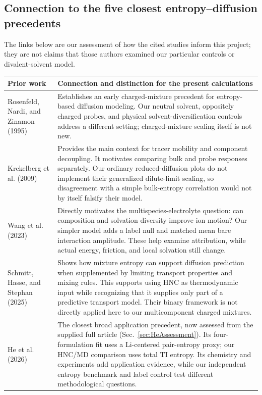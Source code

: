 \documentclass[11pt,a4paper]{article}
\begin{document}
\subsection{Connection to the five closest entropy--diffusion precedents}
The links below are our assessment of how the cited studies inform this
project; they are not claims that those authors examined our particular
controls or divalent-solvent model.
\begin{longtable}{@{}p{}p{}@{}}
\toprule
Prior work & Connection and distinction for the present calculations\\
\midrule
\endhead
Rosenfeld, Nardi, and Zinamon (1995)~\cite{Rosenfeld1995} &
Establishes an early charged-mixture precedent for entropy-based diffusion
modeling. Our neutral solvent, oppositely charged probes, and physical
solvent-diversification controls address a different setting; charged-mixture
scaling itself is not new.\\[3pt]
Krekelberg et al. (2009)~\cite{Krekelberg2009} &
Provides the main context for tracer mobility and component decoupling.
It motivates comparing bulk and probe responses separately. Our ordinary
reduced-diffusion plots do not implement their generalized dilute-limit
scaling, so disagreement with a simple bulk-entropy correlation would not
by itself falsify their model.\\[3pt]
Wang et al. (2023)~\cite{Wang2023} &
Directly motivates the multispecies-electrolyte question: can composition
and solvation diversity improve ion motion? Our simpler model adds a label
null and matched mean bare interaction amplitude. These help examine
attribution, while actual energy, friction, and local solvation still change.\\[3pt]
Schmitt, Hasse, and Stephan (2025)~\cite{Schmitt2025} &
Shows how mixture entropy can support diffusion prediction when supplemented
by limiting transport properties and mixing rules. This supports using HNC
as thermodynamic input while recognizing that it supplies only part of a
predictive transport model. Their binary framework is not directly applied
here to our multicomponent charged mixtures.\\[3pt]
He et al. (2026)~\cite{He2026} &
The closest broad application precedent, now assessed from the supplied
full article (Sec.~\ref{sec:HeAssessment}). Its four-formulation fit uses a
Li-centered pair-entropy proxy; our HNC/MD comparison uses total TI entropy.
Its chemistry and experiments add application evidence, while our independent
entropy benchmark and label control test different methodological questions.\\
\bottomrule
\end{longtable}
\end{document}
